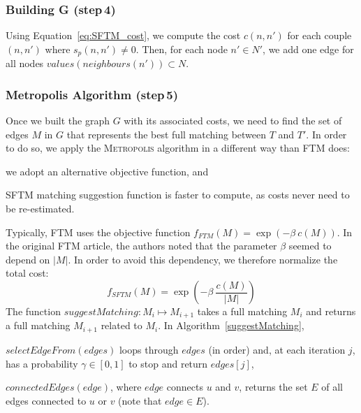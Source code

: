 \subsubsection{Building G (step\,4)}
Using Equation~\ref{eq:SFTM_cost}, we compute the cost $c(n,n')$ for each couple $(n,n')$ where $s_p(n,n') \neq 0$.
Then, for each node $n'\in N'$, we add one edge for all nodes $values(neighbours(n')) \subset N$.

\subsubsection{Metropolis Algorithm (step\,5)}
Once we built the graph $G$ with its associated costs, we need to find the set of edges $M$ in $G$ that represents the best full matching between $T$ and $T'$.
In order to do so, we apply the \textsc{Metropolis} algorithm in a different way than FTM does: 
\begin{inparaenum}
	\item we adopt an alternative objective function, and
    \item SFTM matching suggestion function is faster to compute, as costs never need to be re-estimated.
\end{inparaenum}

Typically, FTM uses the objective function $f_{FTM}(M) = \exp(-\beta\ c(M))$.
In the original FTM article, the authors noted that the parameter $\beta$ seemed to depend on $|M|$.
In order to avoid this dependency, we therefore normalize the total cost:
\begin{equation}
	f_{SFTM}(M) = \exp(-\beta\ \frac{c(M)}{|M|})
\end{equation}
The function $suggestMatching: M_i \mapsto M_{i+1}$ takes a full matching $M_i$ and returns a full matching $M_{i+1}$ related to $M_i$.
In Algorithm~\ref{suggestMatching}, 
\begin{compactenum}
	\item $selectEdgeFrom(edges)$ loops through $edges$ (in order) and, at each iteration $j$, has a probability $\gamma \in [0,1]$ to stop and return $edges[j]$,
    \item $connectedEdges(edge)$, where $edge$ connects $u$ and $v$, returns the set $E$ of all edges connected to $u$ or $v$ (note that $edge \in E$).
\end{compactenum}

